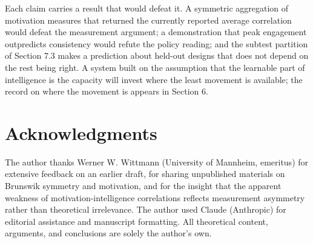\documentclass[12pt,a4paper]{article}
\begin{document}
Each claim carries a result that would defeat it. A symmetric aggregation of motivation measures that returned the currently reported average correlation would defeat the measurement argument; a demonstration that peak engagement outpredicts consistency would refute the policy reading; and the subtest partition of Section 7.3 makes a prediction about held-out designs that does not depend on the rest being right. A system built on the assumption that the learnable part of intelligence is the capacity will invest where the least movement is available; the record on where the movement is appears in Section 6.


\section*{Acknowledgments}

The author thanks Werner W. Wittmann (University of Mannheim, emeritus) for extensive feedback on an earlier draft, for sharing unpublished materials on Brunswik symmetry and motivation, and for the insight that the apparent weakness of motivation-intelligence correlations reflects measurement asymmetry rather than theoretical irrelevance. The author used Claude (Anthropic) for editorial assistance and manuscript formatting. All theoretical content, arguments, and conclusions are solely the author's own.
\end{document}
